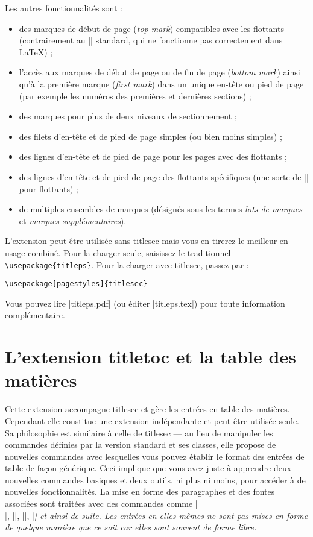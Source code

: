 \documentclass[a4paper]{ltxguide}
\begin{document}
Les autres fonctionnalités sont :
\begin{itemize}
\item des marques de début de page (\emph{top mark}) compatibles avec les
flottants (contrairement au |\topmark| standard, qui ne fonctionne pas
correctement dans \LaTeX{}) ;
\item l'accès aux marques de début de page ou de fin de page (\emph{bottom 
mark}) ainsi qu'à la première marque (\emph{first mark}) dans un unique en-tête
ou pied de page (par exemple les numéros des premières et dernières sections) ;
\item des marques pour plus de deux niveaux de sectionnement ;
\item des filets d'en-tête et de pied de page simples (ou bien moins simples) ;
\item des lignes d'en-tête et de pied de page pour les pages avec des flottants
 ;
\item des lignes d'en-tête et de pied de page des flottants spécifiques (une
sorte de |\thispagestyle| pour flottants) ;
\item de multiples ensembles de marques (désignés sous les termes \emph{lots 
de marques} et \textit{marques supplémentaires}).
\end{itemize}

L'extension peut être utilisée sans \textsf{titlesec} mais vous en tirerez le
meilleur en usage combiné. Pour la charger seule, saisissez le traditionnel 
\verb|\usepackage{titleps}|. Pour la charger avec \textsf{titlesec}, passez 
par :
\begin{verbatim}
\usepackage[pagestyles]{titlesec}
\end{verbatim}

Vous pouvez lire |titleps.pdf| (ou éditer |titleps.tex|) pour toute information
complémentaire.

\section{L'extension \textsf{titletoc} et la table des matières}

Cette extension accompagne \textsf{titlesec} et gère les entrées en table des
matières. Cependant elle constitue une extension indépendante et peut être
utilisée seule. Sa philosophie est similaire à celle de \textsf{titlesec} ---
au lieu de manipuler les commandes définies par la version standard et ses
classes, elle propose de nouvelles commandes avec lesquelles vous pouvez
établir le format des entrées de table de façon générique. Ceci implique que
vous avez juste à apprendre deux nouvelles commandes basiques et deux outils,
ni plus ni moins, pour accéder à de nouvelles fonctionnalités. La mise en forme
des paragraphes et des fontes associées sont traitées avec des commandes comme
|\\|, |\makebox|, |\large|, |\itshape| et ainsi de suite. Les entrées en 
elles-mêmes ne sont pas mises en forme de quelque manière que ce soit car elles
sont souvent de forme libre.
\end{document}

